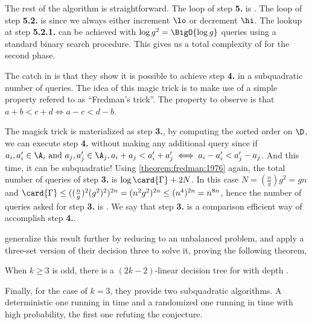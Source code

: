 The rest of the algorithm is straightforward. The loop of step \textbf{5.} is
. The loop of step \textbf{5.2.} is  since we
always either increment $\lo$ or decrement $\hi$. The lookup at step
\textbf{5.2.1.} can be achieved with $\log g^2 = \BigO{\log g}$ queries using
a standard binary search procedure. This gives us a total complexity of
 for the second phase.

The catch in \cite{gronlund:2014} is that they show it is possible to
achieve step \textbf{4.} in a subquadratic number of queries. The idea of this
magic trick is to make use of a simple property refered to as ``Fredman's
trick''. The property to observe is that $a + b < c + d \iff a - c < d - b$.

The magick trick is materialized as step \textbf{3.}, by computing the sorted
order on $\D$, we can execute step \textbf{4.} without making any additional
query since if $a_i, a_i' \in \A_i \text{ and } a_j, a_j' \in \A_j, a_i + a_j <
a_i' + a_j' \iff a_i - a_i' < a_j' - a_j$. And this time, it can be
subquadratic! Using \ref{theorem:fredman:1976} again, the total number of
queries of step \textbf{3.} is $\log \card{\Gamma} + 2N$. In this case $N =
(\frac{n}{g}) g^2 = gn$ and $\card{\Gamma} \le ((\frac{n}{g})^2 (g^2)^2)^{2n} =
(n^2 g^2)^{2n} \le (n^4)^{2n} = n^{8n}$, hence the number of queries asked for
step \textbf{3.} is . We say that step \textbf{3.} is a
comparison efficient way of accomplish step \textbf{4.}.

\citet*{gronlund:2014} generalize this result further by reducing \kLDT to
an unbalanced \threeSUM problem, and apply a three-set version of their
decision three to solve it, proving the following theorem,

\begin{theorem}
When $k \ge 3$ is odd, there is a $(2k-2)$-linear decision tree for \kLDT with
depth .
\end{theorem}

Finally, for the case of $k = 3$, they provide two subquadratic \threeSUM
algorithms. A deterministic one running in  time and a randomized one running in  time with high probability, the first one refuting the \threeSUM
conjecture.
